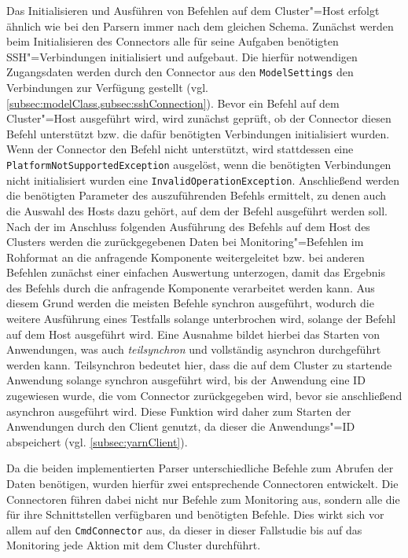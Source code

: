 Das Initialisieren und Ausführen von Befehlen auf dem Cluster"=Host erfolgt ähnlich wie bei den Parsern immer nach dem gleichen Schema.
Zunächst werden beim Initialisieren des Connectors alle für seine Aufgaben benötigten SSH"=Verbindungen initialisiert und aufgebaut.
Die hierfür notwendigen Zugangsdaten werden durch den Connector aus den \texttt{ModelSettings} den Verbindungen zur Verfügung gestellt (vgl. \cref{subsec:modelClass,subsec:sshConnection}).
Bevor ein Befehl auf dem Cluster"=Host ausgeführt wird, wird zunächst geprüft, ob der Connector diesen Befehl unterstützt bzw. die dafür benötigten Verbindungen initialisiert wurden.
Wenn der Connector den Befehl nicht unterstützt, wird stattdessen eine \texttt{PlatformNotSupportedException} ausgelöst, wenn die benötigten Verbindungen nicht initialisiert wurden eine \texttt{InvalidOperationException}.
Anschließend werden die benötigten Parameter des auszuführenden Befehls ermittelt, zu denen auch die Auswahl des Hosts dazu gehört, auf dem der Befehl ausgeführt werden soll.
Nach der im Anschluss folgenden Ausführung des Befehls auf dem Host des Clusters werden die zurückgegebenen Daten bei Monitoring"=Befehlen im Rohformat an die anfragende Komponente weitergeleitet bzw. bei anderen Befehlen zunächst einer einfachen Auswertung unterzogen, damit das Ergebnis des Befehls durch die anfragende Komponente verarbeitet werden kann.
Aus diesem Grund werden die meisten Befehle synchron ausgeführt, wodurch die weitere Ausführung eines Testfalls solange unterbrochen wird, solange der Befehl auf dem Host ausgeführt wird.
Eine Ausnahme bildet hierbei das Starten von Anwendungen, was auch \emph{teilsynchron} und vollständig asynchron durchgeführt werden kann.
Teilsynchron bedeutet hier, dass die auf dem Cluster zu startende Anwendung solange synchron ausgeführt wird, bis der Anwendung eine ID zugewiesen wurde, die vom Connector zurückgegeben wird, bevor sie anschließend asynchron ausgeführt wird.
Diese Funktion wird daher zum Starten der Anwendungen durch den Client genutzt, da dieser die Anwendungs"=ID abspeichert (vgl. \cref{subsec:yarnClient}).

Da die beiden implementierten Parser unterschiedliche Befehle zum Abrufen der Daten benötigen, wurden hierfür zwei entsprechende Connectoren entwickelt.
Die Connectoren führen dabei nicht nur Befehle zum Monitoring aus, sondern alle die für ihre Schnittstellen verfügbaren und benötigten Befehle.
Dies wirkt sich vor allem auf den \texttt{CmdConnector} aus, da dieser in dieser Fallstudie bis auf das Monitoring jede Aktion mit dem Cluster durchführt.

